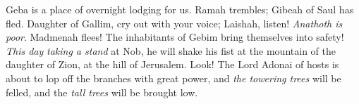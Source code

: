 \begin{biblechapter}
Geba is a place of overnight lodging for us. 
Ramah trembles; 
Gibeah of Saul has fled.
\verse Daughter of Gallim, cry out with your voice; 
Laishah, listen! 
\textit{Anathoth is poor}.
\verse Madmenah flees! 
The inhabitants of Gebim bring themselves into safety!
\verse \textit{This day} \textit{taking a stand} at Nob, 
he will shake his fist at the mountain of the daughter of Zion, 
at the hill of Jerusalem.
\verse Look! The Lord Adonai of hosts is about to lop off the branches with great power, 
and \textit{the towering trees} will be felled, 
and the \textit{tall trees} will be brought low.
\end{biblechapter}

